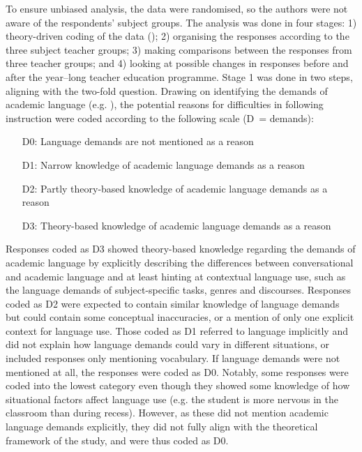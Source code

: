 \documentclass[output=paper]{langscibook}
\begin{document}
\begin{sloppypar}
To ensure unbiased analysis, the data were randomised, so the authors were not aware of the respondents’ subject groups. The analysis was done in four stages: 1) theory-driven coding of the data (\citealt{Krippendorf2012,Saldana2008-1,Tuomi2018-1}); 2) organising the responses according to the three subject teacher groups; 3) making comparisons between the responses from three teacher groups; and 4) looking at possible changes in responses before and after the year–long teacher education programme. Stage 1 was done in two steps, aligning with the two-fold question. Drawing on identifying the demands of academic language (e.g. \citealt{Cummins2000,Schleppegrell2002}), the potential reasons for difficulties in following instruction were coded according to the following scale (D~= demands):
\end{sloppypar}

\begin{enumerate}
  \item[D0:]   Language demands are not mentioned as a reason 
  \item[D1:]   Narrow knowledge of academic language demands as a reason 
  \item[D2:]   Partly theory-based knowledge of academic language demands as a reason 
  \item[D3:]  Theory-based knowledge of academic language demands as a reason
\end{enumerate}
  
Responses coded as D3 showed theory-based knowledge regarding the demands of academic language by explicitly describing the differences between conversational and academic language and at least hinting at contextual language use, such as the language demands of subject-specific tasks, genres and discourses. Responses coded as D2 were expected to contain similar knowledge of language demands but could contain some conceptual inaccuracies, or a mention of only one explicit context for language use. Those coded as D1 referred to language implicitly and did not explain how language demands could vary in different situations, or included responses only mentioning vocabulary. If language demands were not mentioned at all, the responses were coded as D0. Notably, some responses were coded into the lowest category even though they showed some knowledge of how situational factors affect language use (e.g. the student is more nervous in the classroom than during recess). However, as these did not mention academic language demands explicitly, they did not fully align with the theoretical framework of the study, and were thus coded as D0. 
\end{document}
